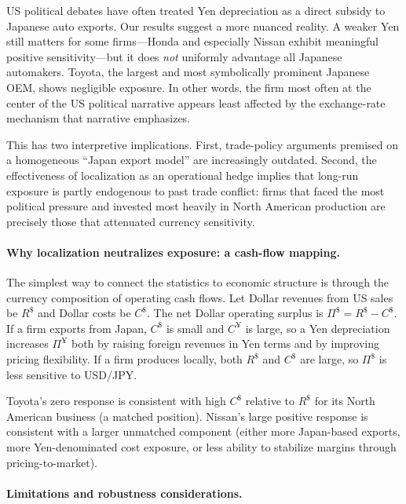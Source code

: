 \documentclass[12pt,a4paper]{article}
\begin{document}
US political debates have often treated Yen depreciation as a direct subsidy to Japanese auto exports. Our results suggest a more nuanced reality. A weaker Yen still matters for some firms---Honda and especially Nissan exhibit meaningful positive sensitivity---but it does \emph{not} uniformly advantage all Japanese automakers. Toyota, the largest and most symbolically prominent Japanese OEM, shows negligible exposure. In other words, the firm most often at the center of the US political narrative appears least affected by the exchange-rate mechanism that narrative emphasizes.

This has two interpretive implications. First, trade-policy arguments premised on a homogeneous ``Japan export model'' are increasingly outdated. Second, the effectiveness of localization as an operational hedge implies that long-run exposure is partly endogenous to past trade conflict: firms that faced the most political pressure and invested most heavily in North American production are precisely those that attenuated currency sensitivity.

\paragraph{Why localization neutralizes exposure: a cash-flow mapping.}

The simplest way to connect the statistics to economic structure is through the currency composition of operating cash flows. Let Dollar revenues from US sales be $R^{\$}$ and Dollar costs be $C^{\$}$. The net Dollar operating surplus is $\Pi^{\$}=R^{\$}-C^{\$}$. If a firm exports from Japan, $C^{\$}$ is small and $C^{\yen}$ is large, so a Yen depreciation increases $\Pi^{\yen}$ both by raising foreign revenues in Yen terms and by improving pricing flexibility. If a firm produces locally, both $R^{\$}$ and $C^{\$}$ are large, so $\Pi^{\$}$ is less sensitive to USD/JPY.

Toyota's zero response is consistent with high $C^{\$}$ relative to $R^{\$}$ for its North American business (a matched position). Nissan's large positive response is consistent with a larger unmatched component (either more Japan-based exports, more Yen-denominated cost exposure, or less ability to stabilize margins through pricing-to-market).

\paragraph{Limitations and robustness considerations.}
\end{document}
